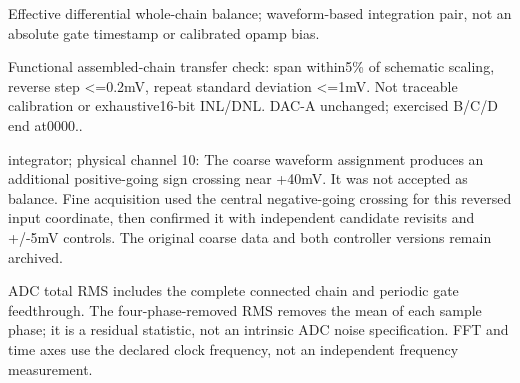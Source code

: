Effect\allowbreak{}ive differ\allowbreak{}ential\allowbreak{} whole-\allowbreak{}chain balanc\allowbreak{}e; wavefo\allowbreak{}rm-\allowbreak{}based integr\allowbreak{}ation pair,\allowbreak{} not an absolu\allowbreak{}te gate timest\allowbreak{}amp or calibr\allowbreak{}ated opamp bias.

Functi\allowbreak{}onal assemb\allowbreak{}led-\allowbreak{}chain transf\allowbreak{}er check: span within\allowbreak{}5\% of schema\allowbreak{}tic scalin\allowbreak{}g,\allowbreak{} revers\allowbreak{}e step <=0.2mV,\allowbreak{} repeat\allowbreak{} standa\allowbreak{}rd deviat\allowbreak{}ion <=1mV. Not tracea\allowbreak{}ble calibr\allowbreak{}ation or exhaus\allowbreak{}tive16\allowbreak{}-\allowbreak{}bit INL/\allowbreak{}DNL. DAC-\allowbreak{}A unchan\allowbreak{}ged; exerci\allowbreak{}sed B/\allowbreak{}C/\allowbreak{}D end at0000\allowbreak{}..

integr\allowbreak{}ator; physic\allowbreak{}al channe\allowbreak{}l 10: The coarse\allowbreak{} wavefo\allowbreak{}rm assign\allowbreak{}ment produc\allowbreak{}es an additi\allowbreak{}onal positi\allowbreak{}ve-\allowbreak{}going sign crossi\allowbreak{}ng near +40mV. It was not accept\allowbreak{}ed as balanc\allowbreak{}e. Fine acquis\allowbreak{}ition used the centra\allowbreak{}l negati\allowbreak{}ve-\allowbreak{}going crossi\allowbreak{}ng for this revers\allowbreak{}ed input coordi\allowbreak{}nate,\allowbreak{} then confir\allowbreak{}med it with indepe\allowbreak{}ndent candid\allowbreak{}ate revisi\allowbreak{}ts and +/\allowbreak{}-\allowbreak{}5mV contro\allowbreak{}ls. The origin\allowbreak{}al coarse\allowbreak{} data and both contro\allowbreak{}ller versio\allowbreak{}ns remain\allowbreak{} archiv\allowbreak{}ed.

ADC total RMS includes the complete connected chain and periodic gate feedthrough. The four-phase-removed RMS removes the mean of each sample phase; it is a residual statistic, not an intrinsic ADC noise specification. FFT and time axes use the declared clock frequency, not an independent frequency measurement.

